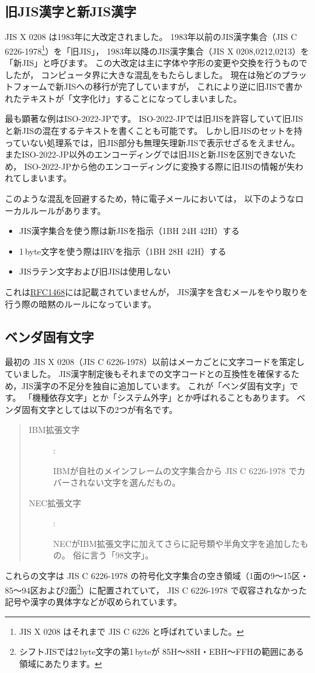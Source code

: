 \documentclass[a4j,10pt,fleqn,uplatex]{jsarticle}
\begin{document}
\subsection{旧JIS漢字と新JIS漢字}

JIS X 0208 は1983年に大改定されました。
1983年以前のJIS漢字集合（JIS C 6226-1978\footnote{
    JIS X 0208 はそれまで JIS C 6226 と呼ばれていました。
}）を「旧JIS」，
1983年以降のJIS漢字集合（JIS X 0208,0212,0213）を「新JIS」と呼びます。
この大改定は主に字体や字形の変更や交換を行うものでしたが，
コンピュータ界に大きな混乱をもたらしました。
現在は殆どのプラットフォームで新JISへの移行が完了していますが，
これにより逆に旧JISで書かれたテキストが「文字化け」することになってしまいました。

最も顕著な例はISO-2022-JPです。
ISO-2022-JPでは旧JISを許容していて旧JISと新JISの混在するテキストを書くことも可能です。
しかし旧JISのセットを持っていない処理系では，旧JIS部分も無理矢理新JISで表示せざるをえません。
またISO-2022-JP以外のエンコーディングでは旧JISと新JISを区別できないため，
ISO-2022-JPから他のエンコーディングに変換する際に旧JISの情報が失われてしまいます。

このような混乱を回避するため，特に電子メールにおいては，
以下のようなローカルルールがあります。
\begin{itemize}
\item JIS漢字集合を使う際は新JISを指示（1BH 24H 42H）する
\item 1\,byte文字を使う際はIRVを指示（1BH 28H 42H）する
\item JISラテン文字および旧JISは使用しない
\end{itemize}%
これは\href{ftp://ftp.isi.edu/in-notes/rfc1468.txt}{RFC1468}には記載されていませんが，
JIS漢字を含むメールをやり取りを行う際の暗黙のルールになっています。


\subsection{ベンダ固有文字}

最初の JIS X 0208（JIS C 6226-1978）以前はメーカごとに文字コードを策定していました。
JIS漢字制定後もそれまでの文字コードとの互換性を確保するため，JIS漢字の不足分を独自に追加しています。
これが「ベンダ固有文字」です。
「機種依存文字」とか「システム外字」とか呼ばれることもあります。
ベンダ固有文字としては以下の2つが有名です。
\begin{quote}\begin{description}
\item[IBM拡張文字] :\par
    IBMが自社のメインフレームの文字集合から JIS C 6226-1978 でカバーされない文字を選んだもの。
\item[NEC拡張文字] :\par
    NECがIBM拡張文字に加えてさらに記号類や半角文字を追加したもの。
    俗に言う「98文字」。
\end{description}\end{quote}
これらの文字は JIS C 6226-1978 の符号化文字集合の空き領域（1面の9～15区・85～94区および2面\footnote{
    シフトJISでは2\,byte文字の第1\,byteが
    85H～88H・EBH～FFHの範囲にある領域にあたります。
}）に配置されていて，
JIS C 6226-1978 で収容されなかった記号や漢字の異体字などが収められています。
\end{document}
